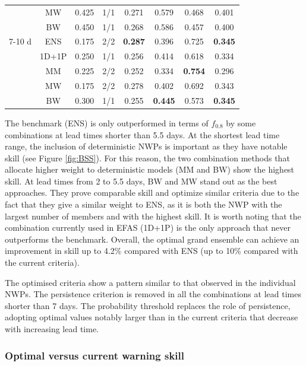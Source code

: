 \documentclass{ametsocV6.1}
\begin{document}
\begin{table}[ht]
\begin{tabular}{cccccccc}
         & MW & 0.425 & 1/1 & 0.271 & 0.579 & 0.468 & 0.401 \\
         & BW & 0.450 & 1/1 & 0.268 & 0.586 & 0.457 & 0.400 \\
         \midrule
        7-10 d & ENS & 0.175 & 2/2 & \textbf{0.287} & 0.396 & 0.725 & \textbf{0.345} \\
         & 1D+1P & 0.250 & 1/1 & 0.256 & 0.414 & 0.618 & 0.334 \\
         & MM & 0.225 & 2/2 & 0.252 & 0.334 & \textbf{0.754} & 0.296 \\
         & MW & 0.175 & 2/2 & 0.278 & 0.402 & 0.692 & 0.343 \\
         & BW & 0.300 & 1/1 & 0.255 & \textbf{0.445} & 0.573 & \textbf{0.345} \\
         \bottomrule
    \end{tabular}
    \label{tab:COMB_optimization}
\end{table}

The benchmark (ENS) is only outperformed in terms of $f_{0.8}$ by some combinations at lead times shorter than 5.5 days. At the shortest lead time range, the inclusion of deterministic NWPs is important as they have notable skill (see Figure \ref{fig:BSS}). For this reason, the two combination methods that allocate higher weight to deterministic models (MM and BW) show the highest skill. At lead times from 2 to 5.5 days, BW and MW stand out as the best approaches. They prove comparable skill and optimize similar criteria due to the fact that they give a similar weight to ENS, as it is both the NWP with the largest number of members and with the highest skill. It is worth noting that the combination currently used in EFAS (1D+1P) is the only approach that never outperforms the benchmark. Overall, the optimal grand ensemble can achieve an improvement in skill up to 4.2\% compared with ENS (up to 10\% compared with the current criteria).

The optimised criteria show a pattern similar to that observed in the individual NWPs. The persistence criterion is removed in all the combinations at lead times shorter than 7 days. The probability threshold replaces the role of persistence, adopting optimal values notably larger than in the current criteria that decrease with increasing lead time.

\subsubsection{Optimal versus current warning skill}
\label{sec:COMB_vs_current}
\end{document}
